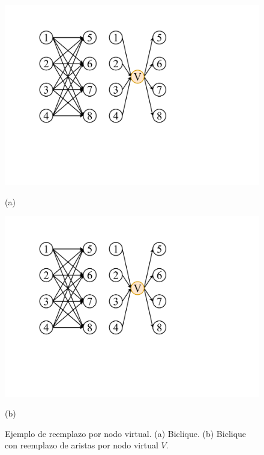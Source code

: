 \begin{figure}%
    	\centering
    	\begin{minipage}{0.45\textwidth}
    		\centering
    		\includegraphics[scale=.3, clip,  trim=100 200 520 70]{img/arte/graphs-virtualNode.pdf}
    		
    		(a)
    	\end{minipage}
    	\begin{minipage}{0.45\textwidth}
    		\centering
    		\includegraphics[scale=.3, clip, trim=330 200 290 70]{img/arte/graphs-virtualNode.pdf}
    		
    		(b)
    	\end{minipage}

    \caption{Ejemplo de reemplazo por nodo virtual. (a) Biclique. (b) Biclique con reemplazo de aristas por nodo virtual $V$.}
    \label{fig:virtualNode}
\end{figure}
